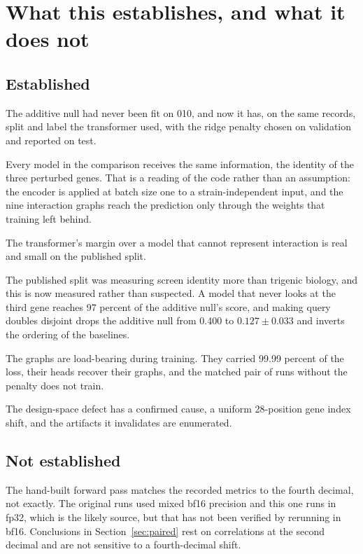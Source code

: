 
\section{What this establishes, and what it does not}
\label{sec:limits}

\subsection{Established}

The additive null had never been fit on 010, and now it has, on the same
records, split and label the transformer used, with the ridge penalty chosen on
validation and reported on test.

Every model in the comparison receives the same information, the identity of the
three perturbed genes. That is a reading of the code rather than an assumption:
the encoder is applied at batch size one to a strain-independent input, and the
nine interaction graphs reach the prediction only through the weights that
training left behind.

The transformer's margin over a model that cannot represent interaction is real
and small on the published split.

The published split was measuring screen identity more than trigenic biology, and
this is now measured rather than suspected. A model that never looks at the third
gene reaches 97 percent of the additive null's score, and making query doubles
disjoint drops the additive null from 0.400 to $0.127 \pm 0.033$ and inverts the
ordering of the baselines.

The graphs are load-bearing during training. They carried 99.99 percent of the
loss, their heads recover their graphs, and the matched pair of runs without the
penalty does not train.

The design-space defect has a confirmed cause, a uniform 28-position gene index
shift, and the artifacts it invalidates are enumerated.

\subsection{Not established}

The hand-built forward pass matches the recorded metrics to the fourth decimal,
not exactly. The original runs used mixed bf16 precision and this one runs in
fp32, which is the likely source, but that has not been verified by rerunning in
bf16. Conclusions in Section~\ref{sec:paired} rest on correlations at the second
decimal and are not sensitive to a fourth-decimal shift.

